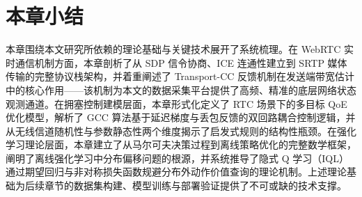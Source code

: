 \section{本章小结}
本章围绕本文研究所依赖的理论基础与关键技术展开了系统梳理。在 WebRTC 实时通信机制方面，本章剖析了从 SDP 信令协商、ICE 连通性建立到 SRTP 媒体传输的完整协议栈架构，并着重阐述了 Transport-CC 反馈机制在发送端带宽估计中的核心作用——该机制为本文的数据采集平台提供了高频、精准的底层网络状态观测通道。在拥塞控制建模层面，本章形式化定义了 RTC 场景下的多目标 QoE 优化模型，解析了 GCC 算法基于延迟梯度与丢包反馈的双回路耦合控制逻辑，并从无线信道随机性与参数静态性两个维度揭示了启发式规则的结构性瓶颈。在强化学习理论层面，本章建立了从马尔可夫决策过程到离线策略优化的完整数学框架，阐明了离线强化学习中分布偏移问题的根源，并系统推导了隐式 Q 学习（IQL）通过期望回归与非对称损失函数规避分布外动作价值查询的理论机制。上述理论基础为后续章节的数据集构建、模型训练与部署验证提供了不可或缺的技术支撑。